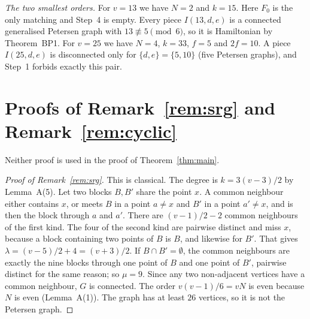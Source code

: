 \documentclass[11pt]{amsart}
\theoremstyle{plain}
\theoremstyle{definition}
\theoremstyle{remark}
\numberwithin{equation}{section}
\begin{document}
\emph{The two smallest orders.} For \(v=13\) we have \(N=2\) and \(k=15\). Here \(F_0\) is the only matching and Step~4 is empty. Every piece \(I(13,d,e)\) is a connected generalised Petersen graph with \(13\not\equiv5\pmod6\), so it is Hamiltonian by Theorem~BP1. For \(v=25\) we have \(N=4\), \(k=33\), \(f=5\) and \(2f=10\). A piece \(I(25,d,e)\) is disconnected only for \(\{d,e\}=\{5,10\}\) (five Petersen graphs), and Step~1 forbids exactly this pair.

\section{Proofs of Remark~\ref{rem:srg} and Remark~\ref{rem:cyclic}}\label{sec:consequences}

Neither proof is used in the proof of Theorem~\ref{thm:main}.

\begin{proof}[Proof of Remark~\ref{rem:srg}]
This is classical. The degree is \(k=3(v-3)/2\) by Lemma~A(5). Let two blocks \(B,B'\) share the point \(x\). A common neighbour either contains \(x\), or meets \(B\) in a point \(a\ne x\) and \(B'\) in a point \(a'\ne x\), and is then the block through \(a\) and \(a'\). There are \((v-1)/2-2\) common neighbours of the first kind. The four of the second kind are pairwise distinct and miss \(x\), because a block containing two points of \(B\) is \(B\), and likewise for \(B'\). That gives \(\lambda=(v-5)/2+4=(v+3)/2\). If \(B\cap B'=\emptyset\), the common neighbours are exactly the nine blocks through one point of \(B\) and one point of \(B'\), pairwise distinct for the same reason; so \(\mu=9\). Since any two non-adjacent vertices have a common neighbour, \(G\) is connected. The order \(v(v-1)/6=vN\) is even because \(N\) is even (Lemma~A(1)). The graph has at least \(26\) vertices, so it is not the Petersen graph.
\end{proof}
\end{document}
